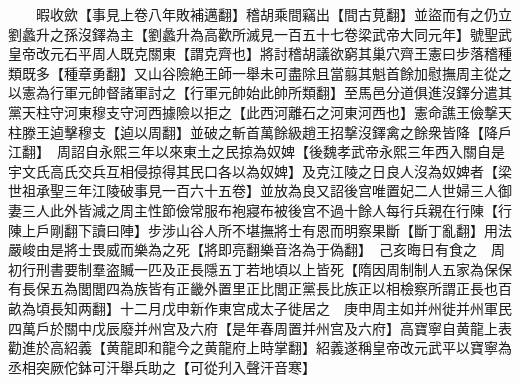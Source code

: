 　　暇收歛【事見上卷八年敗補邁翻】稽胡乘間竊出【間古莧翻】並盜而有之仍立劉蠡升之孫沒鐸為主【劉蠡升為高歡所滅見一百五十七卷梁武帝大同元年】號聖武皇帝改元石平周人既克關東【謂克齊也】將討稽胡議欲窮其巢穴齊王憲曰步落稽種類既多【種章勇翻】又山谷險絶王師一舉未可盡除且當翦其魁首餘加慰撫周主從之以憲為行軍元帥督諸軍討之【行軍元帥始此帥所類翻】至馬邑分道俱進沒鐸分遣其黨天柱守河東穆支守河西據險以拒之【此西河離石之河東河西也】憲命譙王儉撃天柱滕王逌擊穆支【逌以周翻】並破之斬首萬餘級趙王招撃沒鐸禽之餘衆皆降【降戶江翻】　周詔自永熙三年以來東土之民掠為奴婢【後魏孝武帝永熙三年西入關自是宇文氏高氏交兵互相侵掠得其民口各以為奴婢】及克江陵之日良人沒為奴婢者【梁世祖承聖三年江陵破事見一百六十五卷】並放為良又詔後宫唯置妃二人世婦三人御妻三人此外皆減之周主性節儉常服布袍寢布被後宫不過十餘人每行兵親在行陳【行陳上戶剛翻下讀曰陣】步涉山谷人所不堪撫將士有恩而明察果斷【斷丁亂翻】用法嚴峻由是將士畏威而樂為之死【將即亮翻樂音洛為于偽翻】　己亥晦日有食之　周初行刑書要制羣盗贓一匹及正長隱五丁若地頃以上皆死【隋因周制制人五家為保保有長保五為閭閭四為族皆有正畿外置里正比閭正黨長比族正以相檢察所謂正長也百畝為頃長知两翻】十二月戊申新作東宫成太子徙居之　庚申周主如并州徙并州軍民四萬戶於關中戊辰廢并州宫及六府【是年春周置并州宫及六府】高寶寧自黄龍上表勸進於高紹義【黄龍即和龍今之黄龍府上時掌翻】紹義遂稱皇帝改元武平以寶寧為丞相突厥佗鉢可汗舉兵助之【可從刋入聲汗音寒】

